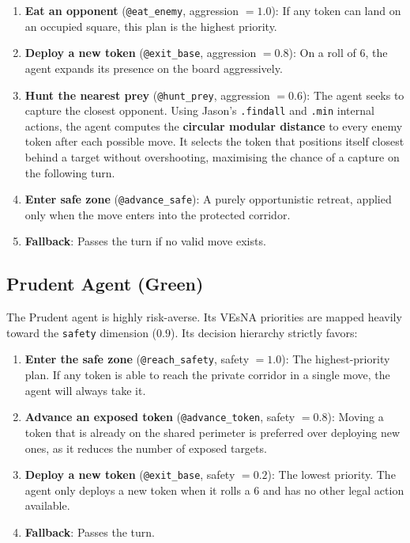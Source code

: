 \documentclass[12pt]{article}
\begin{document}
\begin{enumerate}
    \item \textbf{Eat an opponent} (\texttt{@eat\_enemy}, aggression $= 1.0$):
    If any token can land on an occupied square, this plan is the highest priority.
    \item \textbf{Deploy a new token} (\texttt{@exit\_base}, aggression $= 0.8$):
    On a roll of 6, the agent expands its presence on the board aggressively.
    \item \textbf{Hunt the nearest prey} (\texttt{@hunt\_prey}, aggression $= 0.6$):
    The agent seeks to capture the closest opponent. Using Jason's \texttt{.findall} and \texttt{.min}
    internal actions, the agent computes the \textbf{circular modular distance}
    to every enemy token after each possible move. It selects the token that
    positions itself closest behind a target without overshooting, maximising
    the chance of a capture on the following turn.
    \item \textbf{Enter safe zone} (\texttt{@advance\_safe}): A purely
    opportunistic retreat, applied only when the move enters into the protected
    corridor.
    \item \textbf{Fallback}: Passes the turn if no valid move exists.
\end{enumerate}

\subsection{Prudent Agent (Green)}
\label{subsec:agent_prudent}
\noindent The Prudent agent is highly risk-averse. Its VEsNA priorities are
mapped heavily toward the \texttt{safety} dimension ($0.9$). Its decision
hierarchy strictly favors:

\begin{enumerate}
    \item \textbf{Enter the safe zone} (\texttt{@reach\_safety}, safety $= 1.0$):
    The highest-priority plan. If any token is able to reach the private corridor in a
    single move, the agent will always take it.
    \item \textbf{Advance an exposed token} (\texttt{@advance\_token},
    safety $= 0.8$): Moving a token that is already on the shared perimeter is
    preferred over deploying new ones, as it reduces the number of exposed targets.
    \item \textbf{Deploy a new token} (\texttt{@exit\_base}, safety $= 0.2$):
    The lowest priority. The agent only deploys a new token when it rolls a 6
    and has no other legal action available.
    \item \textbf{Fallback}: Passes the turn.
\end{enumerate}
\end{document}
